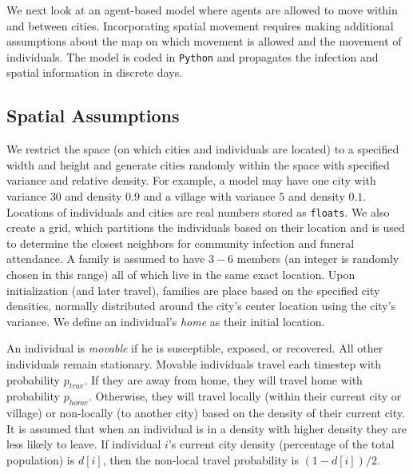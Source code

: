 
We next look at an agent-based model where agents are allowed to move within and between cities. Incorporating spatial movement requires making additional assumptions about the map on which movement is allowed and the movement of individuals. The model is coded in \texttt{Python} and propagates the infection and spatial information in discrete days. 

\subsection{Spatial Assumptions}
We restrict the space (on which cities and individuals are located) to a specified width and height and generate cities randomly within the space with specified variance and relative density. For example, a model may have one city with variance $30$ and density $0.9$ and a village with variance $5$ and density $0.1$. Locations of individuals and cities are real numbers stored as \texttt{floats}. We also create a grid, which partitions the individuals based on their location and is used to determine the closest neighbors for community infection and funeral attendance. A family is assumed to have $3-6$ members (an integer is randomly chosen in this range) all of which live in the same exact location. Upon initialization (and later travel), families are place based on the specified city densities, normally distributed around the city's center location using the city's variance. We define an individual's \emph{home} as their initial location.

An individual is \emph{movable} if he is susceptible, exposed, or recovered. All other individuals remain stationary. Movable individuals travel each timestep with probability $p_{trav}$. If they are away from home, they will travel home with probability $p_{home}$. Otherwise, they will travel locally (within their current city or village) or non-locally (to another city) based on the density of their current city. It is assumed that when an individual is in a density with higher density they are less likely to leave. If individual $i$'s current city density (percentage of the total population) is $d[i]$, then the non-local travel probability is $(1-d[i])/2$.

